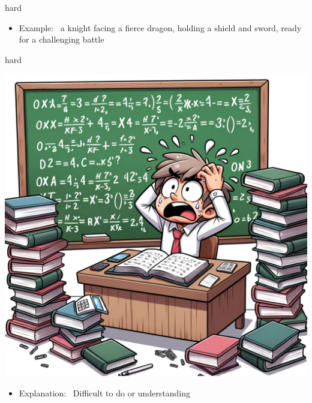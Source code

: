 \documentclass[avery5371, grid,frame]{flashcards}
\begin{document}
\begin{flashcard}{hard}
\begin{center}
\begin{minipage}[c]{.45\textwidth}
\begin{itemize}
            \item Example: \ a knight facing a fierce dragon, holding a shield and sword, ready for a challenging battle
            \end{itemize}
        \end{minipage}
    \end{center}
    \vspace*{\fill}
\end{flashcard}\begin{flashcard}{hard}
    \vspace*{\fill}
    \begin{center}
        \begin{minipage}[c]{.45\textwidth}
            \includegraphics[width=\textwidth]{cards/h/hard/hard - a student scratching their head, surrounded by piles of books, trying to solve a complex math problem on a chalkboard.png}
        \end{minipage}
        \begin{minipage}[c]{.45\textwidth}
            \begin{itemize}\setlength\itemsep{12pt}
            \item Explanation: \ Difficult to do or understanding


\end{itemize}
\end{minipage}
\end{center}
\end{flashcard}
\end{document}
